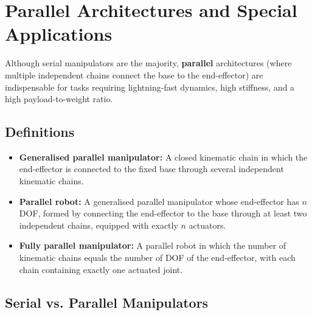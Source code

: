 \documentclass[11pt,a4paper,twoside]{report}
\begin{document}
\chapter{Parallel Architectures and Special Applications}

Although serial manipulators are the majority, \textbf{parallel} architectures (where multiple independent chains connect the base to the end-effector) are indispensable for tasks requiring lightning-fast dynamics, high stiffness, and a high payload-to-weight ratio.

\section{Definitions}
\begin{itemize}
    \item \textbf{Generalised parallel manipulator:} A closed kinematic chain in which the end-effector is connected to the fixed base through several independent kinematic chains.
    \item \textbf{Parallel robot:} A generalised parallel manipulator whose end-effector has $n$ DOF, formed by connecting the end-effector to the base through at least two independent chains, equipped with exactly $n$ actuators.
    \item \textbf{Fully parallel manipulator:} A parallel robot in which the number of kinematic chains equals the number of DOF of the end-effector, with each chain containing exactly one actuated joint.
\end{itemize}

\section{Serial vs. Parallel Manipulators}
\end{document}
